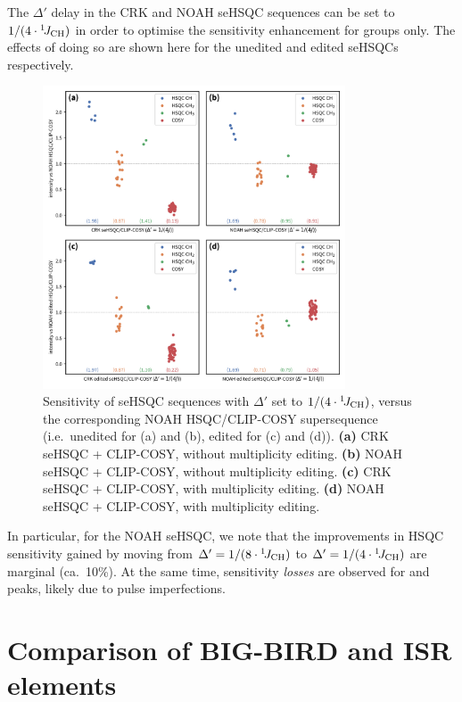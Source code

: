 The $\Delta'$ delay in the CRK and NOAH seHSQC sequences can be set to $1/(4\cdot\onejch)$ in order to optimise the sensitivity enhancement for  groups only.
The effects of doing so are shown here for the unedited and edited seHSQCs respectively.

\begin{figure}
    \centering
    \includegraphics[width=0.8\textwidth]{./figures/combined_1_4j.png}
    \caption{
        Sensitivity of seHSQC sequences with $\Delta'$ set to $1/(4\cdot\onejch)$, versus the corresponding NOAH HSQC/CLIP-COSY supersequence (i.e.\ unedited for (a) and (b), edited for (c) and (d)).
        \textbf{(a)} CRK seHSQC + CLIP-COSY, without multiplicity editing.
        \textbf{(b)} NOAH seHSQC + CLIP-COSY, without multiplicity editing.
        \textbf{(c)} CRK seHSQC + CLIP-COSY, with multiplicity editing.
        \textbf{(d)} NOAH seHSQC + CLIP-COSY, with multiplicity editing.
        \andro{}
    }
    \label{fig:combined_1_4j}
\end{figure}

In particular, for the NOAH seHSQC, we note that the improvements in HSQC  sensitivity gained by moving from $\Delta' = 1/(8\cdot\onejch)$ to $\Delta' = 1/(4\cdot\onejch)$ are marginal (ca.\ 10\%).
At the same time, sensitivity \textit{losses} are observed for  and  peaks, likely due to pulse imperfections.

\section{Comparison of BIG-BIRD and ISR elements}

